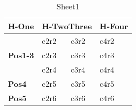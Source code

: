 \begin{longtable}{llll}
\caption{Sheet1}\label{tbl:sheet1} \\ 
\toprule 
\textbf{H-One} 	 & 	 \multicolumn{2}{c}{\multirow{1}{*}{\textbf{H-TwoThree}}} 	 & 	 \textbf{H-Four} \\ 
\midrule 
\midrule 
\multicolumn{1}{c}{\multirow{3}{*}[-3ex]{\textbf{Pos1-3}}} 	 & 	 c2r2 	 & 	 c3r2 	 & 	 c4r2 \\ 
\midrule 
\cmidrule(r){2-4} 	  
  	 & 	 c2r3 	 & 	 c3r3 	 & 	 c4r3 \\ 
\cmidrule(r){2-4} 	  
\cmidrule(r){2-4} 	  
  	 & 	 c2r4 	 & 	 c3r4 	 & 	 c4r4 \\ 
\midrule 
\midrule 
\textbf{Pos4} 	 & 	 c2r5 	 & 	 c3r5 	 & 	 c4r5 \\ 
\midrule 
\midrule 
\textbf{Pos5} 	 & 	 c2r6 	 & 	 c3r6 	 & 	 c4r6 \\ 
\bottomrule 
\end{longtable} 


